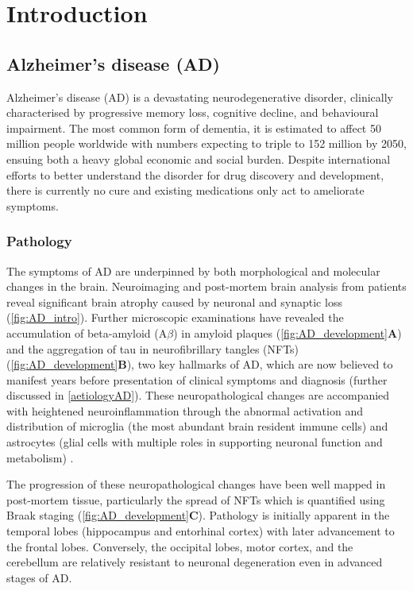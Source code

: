 \chapter{Introduction}

\section{Alzheimer's disease (AD)}

Alzheimer’s disease (AD) is a devastating neurodegenerative disorder, clinically characterised by progressive memory loss, cognitive decline, and behavioural impairment. The most common form of dementia, it is estimated to affect 50 million people worldwide with numbers expecting to triple to 152 million by 2050, ensuing both a heavy global economic and social burden\cite{International2020}. Despite international efforts to better understand the disorder for drug discovery and development, there is currently no cure and existing medications only act to ameliorate symptoms.

\subsection{Pathology}
\label{ch1: ad_pathology}
The symptoms of AD are underpinned by both morphological and molecular changes in the brain. Neuroimaging and post-mortem brain analysis from patients reveal significant brain atrophy caused by neuronal and synaptic loss\cite{Selkoe1991,Perl2010} (\cref{fig:AD_intro}). Further microscopic examinations have revealed the accumulation of beta-amyloid (A$\beta$) in amyloid plaques (\cref{fig:AD_development}\textbf{A}) and the aggregation of tau in neurofibrillary tangles (NFTs) (\cref{fig:AD_development}\textbf{B}), two key hallmarks of AD, which are now believed to manifest years before presentation of clinical symptoms and diagnosis \cite{Sperling2011} (further discussed in \cref{aetiologyAD}). These neuropathological changes are accompanied with heightened neuroinflammation through the abnormal activation and distribution of microglia (the most abundant brain resident immune cells) and astrocytes (glial cells with multiple roles in supporting neuronal function and metabolism) \cite{Heneka2015}. 

The progression of these neuropathological changes have been well mapped in post-mortem tissue, particularly the spread of NFTs which is quantified using Braak staging\cite{H1991} (\cref{fig:AD_development}\textbf{C}). Pathology is initially apparent in the temporal lobes (hippocampus and entorhinal cortex) with later advancement to the frontal lobes. Conversely, the occipital lobes, motor cortex, and the cerebellum are relatively resistant to neuronal degeneration even in advanced stages of AD\cite{Xu2019}.

